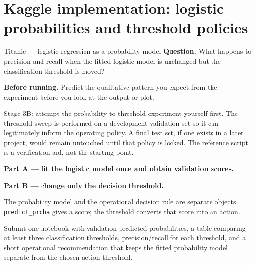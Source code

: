 \section{Kaggle implementation: logistic probabilities and threshold policies}
\label{sec:kaggle-titanic-logistic}

\begin{kaggleproject}{Titanic --- logistic regression as a probability model}
\textbf{Question.} What happens to precision and recall when the fitted logistic model is unchanged but the classification threshold is moved?
\end{kaggleproject}

\textbf{Before running.} Predict the qualitative pattern you expect from the experiment before you look at the output or plot.

\begin{labmode}
Stage 3B: attempt the probability-to-threshold experiment yourself first. The threshold sweep is performed on a development validation set so it can legitimately inform the operating policy. A final test set, if one exists in a later project, would remain untouched until that policy is locked. The reference script is a verification aid, not the starting point.
\end{labmode}

\textbf{Part A --- fit the logistic model once and obtain validation scores.}



\newpage
\textbf{Part B --- change only the decision threshold.}




\begin{keyidea}
The probability model and the operational decision rule are separate objects. \texttt{predict\_proba} gives a score; the threshold converts that score into an action.
\end{keyidea}

\begin{labdeliverable}
Submit one notebook with validation predicted probabilities, a table comparing at least three classification thresholds, precision/recall for each threshold, and a short operational recommendation that keeps the fitted probability model separate from the chosen action threshold.
\end{labdeliverable}
